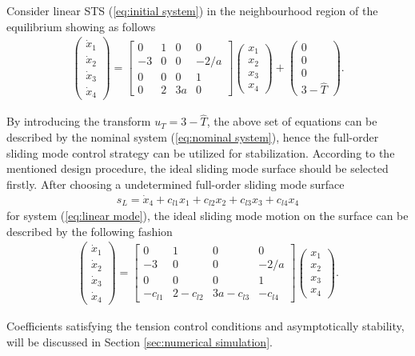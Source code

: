 \documentclass[conference]{IEEEtran}
\theoremstyle{plain}
\begin{document}
Consider linear STS (\ref{eq:initial system}) in the neighbourhood region of the equilibrium showing as follows
\begin{align}
\begin{pmatrix}
\dot x_1\\
\dot x_2\\
\dot x_3\\
\dot x_4
\end{pmatrix}
=
\begin{bmatrix}
0   &1  &0 &0\\
-3  &0  &0 &-2/a\\
0   &0  &0 &1\\
0   &2 &3a &0
\end{bmatrix}
\begin{pmatrix}
x_1\\
x_2\\
x_3\\
x_4
\end{pmatrix}
+
\begin{pmatrix}
0\\0\\0\\3-\hat{T}
\end{pmatrix}.\label{eq:linear mode}
\end{align}\par
By introducing the transform $u_T = 3-\hat T$, the above set of equations can be described by the nominal system (\ref{eq:nominal system}), hence the full-order sliding mode control strategy can be utilized for stabilization. According to the mentioned design procedure, the ideal sliding mode surface should be selected firstly. After choosing a undetermined full-order sliding mode surface
\begin{align}
s_L = \dot x_4 + c_{l1}x_1+c_{l2}x_2+c_{l3}x_3+ c_{l4}x_4\label{eq:linear parameter sliding mode}
\end{align}
for system (\ref{eq:linear mode}), the ideal sliding mode motion on the surface can be described by the following fashion
\begin{align}
\begin{pmatrix}
\dot x_1\\
\dot x_2\\
\dot x_3\\
\dot x_4
\end{pmatrix}
=
\begin{bmatrix}
0   &1  &0 &0\\
-3  &0  &0 &-2/a\\
0   &0  &0 &1\\
-c_{l1}   &2-c_{l2} &3a-c_{l3} &-c_{l4}
\end{bmatrix}
\begin{pmatrix}
x_1\\
x_2\\
x_3\\
x_4
\end{pmatrix}.\label{eq:linear sliding fashion}
\end{align}\par
Coefficients satisfying the tension control conditions and asymptotically stability, will be discussed in Section \ref{sec:numerical simulation}.
\end{document}
